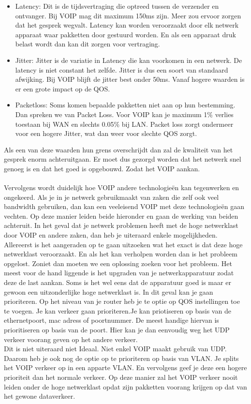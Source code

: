 \documentclass[pdftex,a4paper,12pt,twoside]{report}
\begin{document}
\begin{itemize}
	\item Latency: Dit is de tijdsvertraging die optreed tussen de verzender en ontvanger. Bij VOIP mag dit maximum 150ms zijn. Meer zou ervoor zorgen dat het gesprek wegvalt. Latency kan worden veroorzaakt door elk netwerk apparaat waar pakketten door gestuurd worden. En als een apparaat druk belast wordt dan kan dit zorgen voor vertraging.
	\item Jitter: Jitter is de variatie in Latency die kan voorkomen in een netwerk. De latency is niet constant het zelfde. Jitter is dus een soort van standaard afwijking. Bij VOIP blijft de jitter best onder 50ms. Vanaf hogere waarden is er een grote impact op de QOS.
	\item Packetloss: Soms komen bepaalde pakketten niet aan op hun bestemming. Dan spreken we van Packet Loss. Voor VOIP kan je  maximum 1\% verlies toestaan bij WAN en slechts 0.05\% bij LAN. Packet loss zorgt ondermeer voor een hogere Jitter, wat dan weer voor slechte QOS zorgt. 
\end{itemize}
Als een van deze waarden hun grens overschrijdt dan zal de kwaliteit van het gesprek enorm achteruitgaan. Er moet dus gezorgd worden dat het netwerk snel genoeg is en dat het goed is opgebouwd. Zodat het VOIP aankan. \\ \\
Vervolgens wordt duidelijk hoe VOIP andere technologieën kan tegenwerken en ongekeerd. Als je in je netwerk gebruikmaakt van zaken die zelf ook veel bandwidth gebruiken, dan kan een veeleisend VOIP met deze technologieën gaan vechten. Op deze manier leiden beide hieronder en gaan de werking van beiden achteruit. In het geval dat je netwerk problemen heeft met de hoge netwerklast door VOIP en andere zaken, dan heb je uiteraard enkele mogelijkheden. Allereerst is het aangeraden op te gaan uitzoeken wat het exact is dat deze hoge netwerklast veroorzaakt. En als het kan verholpen worden dan is het probleem opgelost. Zoniet dan moeten we een oplossing zoeken voor het probleem.  Het meest voor de hand liggende is het upgraden van je netwerkapparatuur zodat deze de last aankan. Soms is het wel eens dat de apparatuur goed is maar er gewoon een uitzonderlijke hoge netwerklast is. In dit geval kan je gaan prioriteren. Op het niveau van je router heb je te optie op QOS instellingen toe te voegen. Je kan verkeer gaan prioriteren.Je kan priotiseren op basis van de ethernetpoort, mac adress of poortnummer. De meest handige hiervan is prioritiseren op basis van de poort. Hier kan je dan eenvoudig weg het UDP verkeer voorang geven op het andere verkeer.\\
Dit is niet uiteraard niet Ideaal. Niet enkel VOIP maakt gebruik van UDP. Daarom heb je ook nog de optie op te prioriteren op basis van VLAN. Je splits het VOIP verkeer op in een apparte VLAN. En vervolgens geef je deze een hogere prioriteit dan het normale verkeer. Op deze manier zal het VOIP verkeer nooit leiden onder de hoge netwerklast opdat zijn pakketten voorang krijgen op dat van het gewone dataverkeer.
\end{document}
